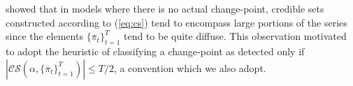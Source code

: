 \cite{Cappello22} showed that in models where there is no actual change-point, credible sets constructed according to (\ref{eq:cs}) tend to encompass large portions of the series since the elements $\{\overline{\pi}_t\}_{t=1}^T$ tend to be quite diffuse. This observation motivated \cite{Cappello22} to adopt the heuristic of classifying a change-point as detected only if $|\mathcal{CS}(\alpha, \{\overline{\pi}_t\}_{t=1}^T)| \leq T/2$, a convention which we also adopt.